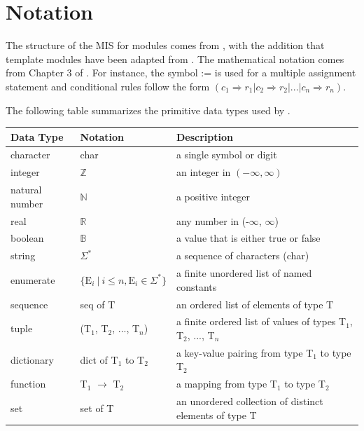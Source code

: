 \documentclass[12pt, titlepage]{article}
\newcommand{\True}{\textnormal{true}}
\newcommand{\False}{\textnormal{false}}
\begin{document}
\section{Notation} \label{SecNotation}


The structure of the MIS for modules comes from \citet{HoffmanAndStrooper1995},
with the addition that template modules have been adapted from
\cite{GhezziEtAl2003}.  The mathematical notation comes from Chapter 3 of
\citet{HoffmanAndStrooper1995}.  For instance, the symbol := is used for a
multiple assignment statement and conditional rules follow the form $(c_1
\Rightarrow r_1 | c_2 \Rightarrow r_2 | ... | c_n \Rightarrow r_n )$.

The following table summarizes the primitive data types used by \progname.

\begin{center}
\renewcommand{\arraystretch}{1.2}
\noindent
\begin{tabular}{l l p{7.5cm}}
\toprule
\textbf{Data Type} & \textbf{Notation} & \textbf{Description}\\
\midrule
character & char & a single symbol or digit\\
integer & $\mathbb{Z}$ & an integer in $(-\infty, \infty)$ \\
natural number & $\mathbb{N}$ & a positive integer \\
real & $\mathbb{R}$ & any number in (-$\infty$, $\infty$)\\
boolean & $\mathbb{B}$ & a value that is either \True{} or \False{}\\
string & $\Sigma^*$ & a sequence of characters (char)\\
enumerate & $\{\text{E}_i \:|\: i \leq n, \text{E}_i \in \Sigma^*\}$ & a finite
unordered list of named constants\\
sequence & seq of T & an ordered list of elements of type T\\
tuple & (T$_1$, T$_2$, ..., T$_n$) & a finite ordered list of values of types
T$_1$, T$_2$, ..., T$_n$\\
dictionary & dict of T$_1$ to T$_2$ & a key-value pairing from type T$_1$ to
type T$_2$\\
function & T$_1$ $\rightarrow$ T$_2$ & a mapping from type T$_1$ to type T$_2$\\
set & set of T & an unordered collection of distinct elements of type T\\
\bottomrule
\end{tabular}
\end{center}
\end{document}
